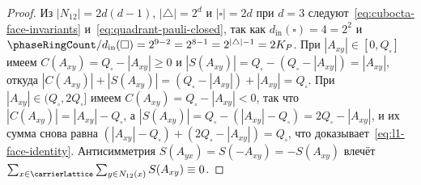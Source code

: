 \begin{proof}
Из $|N_{12}|=2d(d-1)$, $|\triangle|=2^d$ и $|\square|=2d$ при $d=3$ следуют~\eqref{eq:cubocta-face-invariants}
и~\eqref{eq:quadrant-pauli-closed}, так как $d_{\mathrm{in}}(\square)=4=2^2$ и $\phaseRingCount/d_{\mathrm{in}}(\square)=2^{9-2}=2^{8-1}=2^{|\triangle|-1}=2K_P$.
При $|A_{xy}|\in[0,Q_\square]$ имеем $C(A_{xy}) = Q_\square - |A_{xy}|\ge 0$ и $|S(A_{xy})| = Q_\square - (Q_\square - |A_{xy}|) = |A_{xy}|$,
откуда $|C(A_{xy})|+|S(A_{xy})| = (Q_\square - |A_{xy}|) + |A_{xy}| = Q_\square$.
При $|A_{xy}|\in(Q_\square, 2Q_\square]$ имеем $C(A_{xy}) = Q_\square - |A_{xy}| < 0$, так что $|C(A_{xy})| = |A_{xy}| - Q_\square$,
а $|S(A_{xy})| = Q_\square - (|A_{xy}| - Q_\square) = 2Q_\square - |A_{xy}|$, и их сумма снова равна
$(|A_{xy}| - Q_\square) + (2Q_\square - |A_{xy}|) = Q_\square$, что доказывает~\eqref{eq:l1-face-identity}.
Антисимметрия $S(A_{yx}) = S(-A_{xy}) = -S(A_{xy})$ влечёт $\sum_{x\in\carrierLattice}\sum_{y\in N_{12}(x)} S(A_{xy}) \equiv 0$.
\end{proof}

